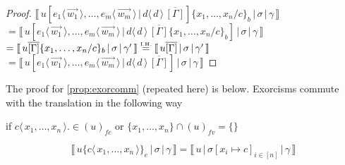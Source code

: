 \documentclass[a4paper,UKenglish,cleveref, autoref]{lipics-v2019}
\newcommand{\fv}[1]{(#1)_{fv}}
\newcommand{\fc}[1]{(#1)_{fc}}
\newcommand{\set}[1]{ \{ #1 \} }
\newcommand{\fake}[3]{#1 \langle \, #2 \, \rangle . #3}
\newcommand{\dist}[5]{#1 [ #2 \, \vert \, \fakedist{#4}{#5} \, #3 ]}
\newcommand{\fakedist}[2]{#1 \langle \, #2 \, \rangle}
\newcommand{\psub}[3]{#1 \{ #2 / #3 \}_{b}}
\newcommand{\exor}[3]{#1 \{ \fakedist{#2}{#3} \}_{e}}
\newcommand{\readbackwmap}[3]{\llbracket \, #1 \, \vert \, #2 \, \vert \, #3  \, \rrbracket }
\newcommand{\IH}{\stackrel{\hbox{\tiny I.H.}}{\hbox{=}}}
\begin{document}
\begin{proof}
$\readbackwmap{\dist{u}{\fakedist{e_{1}}{\vec{w_{1}}}, \dots, \fakedist{e_{m}}{\vec{w_{m}}}}{\overline{[\Gamma]}}{d}{d}  \psub{}{x_{1}, \dots, x_{n}}{c}}{\sigma}{\gamma}$
\newline
$= \readbackwmap{\dist{u}{\fakedist{e_{1}}{\vec{w_{1}}}, \dots, \fakedist{e_{m}}{\vec{w_{m}}}}{\overline{[\Gamma]} \psub{}{x_{1}, \dots, x_{n}}{c}}{d}{d} }{\sigma}{\gamma}$
\newline
$= \readbackwmap{u \overline{[\Gamma]}\psub{}{x_{1}, \dots, x_{n}}{c}}{\sigma}{\gamma'} \IH \readbackwmap{u \overline{[\Gamma]}}{\sigma}{\gamma'}$
\newline
$= \readbackwmap{\dist{u}{\fakedist{e_{1}}{\vec{w_{1}}}, \dots, \fakedist{e_{m}}{\vec{w_{m}}}}{\overline{[\Gamma]}}{d}{d}}{\sigma}{\gamma}$
\end{proof}


The proof for \ref{prop:exorcomm} (repeated here) is below. Exorcisms commute with the translation in the following way

if $\fake{c}{x_{1}, \dots, x_{n}} \in \fc{u}$ or $\set{x_{1}, \dots, x_{n}} \cap \fv{u} = \set{}$

$$\readbackwmap{u \exor{}{c}{x_{1}, \dots, x_{n}}}{\sigma}{\gamma} = \readbackwmap{u}{\sigma[x_{i} \mapsto c]_{i \in [n]}}{\gamma}$$
\end{document}

